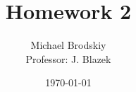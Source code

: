 


\title{Homework 2}
\date{\today}
\author{Michael Brodskiy\\ \small Professor: J. Blazek}



\maketitle


